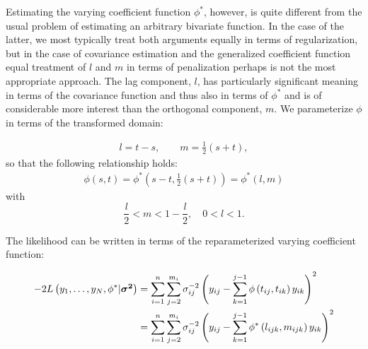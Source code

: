 \documentclass[12pt]{article}
\newcommand{\vsigmasq}{\mbox{\boldmath $\sigma^2$}}
\theoremstyle{definition}
\begin{document}
Estimating the varying coefficient function $\phi^*$, however, is quite different from the usual problem of estimating an arbitrary bivariate function. In the case of the latter, we most typically treat both arguments equally in terms of regularization, but in the case of covariance estimation and the generalized coefficient function equal treatment of $l$ and $m$ in terms of penalization perhaps is not the most appropriate approach. The lag component, $l$, has particularly significant meaning in terms of the covariance function and thus also in terms of $\phi^*$ and is of considerable more interest than the orthogonal component, $m$. We parameterize $\phi$ in terms of the transformed domain:

\begin{align*}
l = t-s, \qquad m = \frac{1}{2}\left(s+t\right),
\end{align*}
\noindent
so that the following relationship holds:
\begin{align*}
\phi\left(s,t\right) = \phi^*\left(s-t, \frac{1}{2}\left(s+t\right)\right) =\phi^*\left(l,m\right)
\end{align*}
with 
\begin{equation} \label{eq:phi-star-domain}
\frac{l}{2} < m < 1 - \frac{l}{2}, \quad 0 < l < 1.
\end{equation}

\noindent
The likelihood can be written in terms of the reparameterized varying coefficient function:

\begin{align} 
\begin{split} \label{loglikelihood}
-2L\left(y_1,\dots,y_N ,\phi^* \vert \vsigmasq \right) &= \sum_{i=1}^n \sum_{j=2}^{m_i} \sigma_{ij}^{-2} \left(y_{ij} - \sum_{k=1}^{j-1}\phi\left({t_{ij},t_{ik}}\right)y_{ik} \right)^2 \\
&= \sum_{i=1}^n \sum_{j=2}^{m_i} \sigma_{ij}^{-2} \left(y_{ij} - \sum_{k=1}^{j-1}\phi^*\left({l_{ijk},m_{ijk}}\right)y_{ik} \right)^2 
\end{split} 
\end{align}
\end{document}
